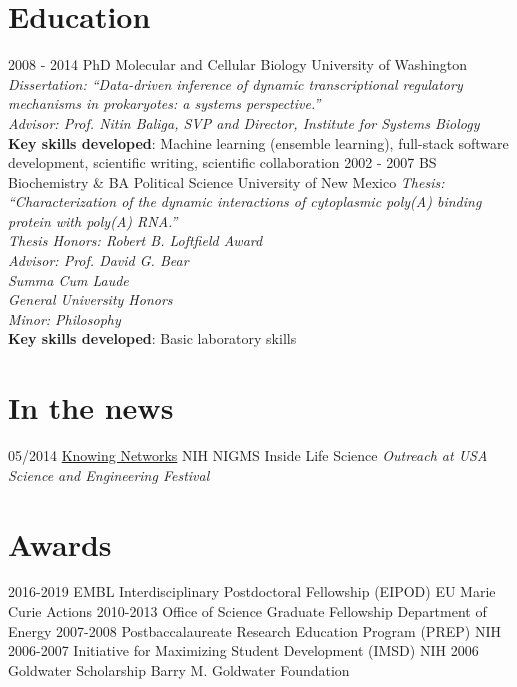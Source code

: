 \documentclass[usenames,dvipsnames]{friggeri-cv}
\begin{document}
\section{Education}
\begin{entrylist}
  \entry
    {2008 - 2014}
    {PhD Molecular and Cellular Biology}
    {University of Washington}
    {\emph{Dissertation: ``Data-driven inference of dynamic transcriptional regulatory mechanisms in prokaryotes: a systems perspective.''}\\
    \emph{Advisor: Prof. Nitin Baliga, SVP and Director, Institute for Systems Biology}\\
    \textbf{Key skills developed}: Machine learning (ensemble learning), full-stack software development, scientific writing, scientific collaboration}
  \entry
    {2002 - 2007}
    {BS Biochemistry \& BA Political Science}
    {University of New Mexico}
    {\emph{Thesis: ``Characterization of the dynamic interactions of cytoplasmic poly(A) binding protein with poly(A) RNA.''}\\
    \textit{Thesis Honors: Robert B. Loftfield Award}\\
    \emph{Advisor: Prof. David G. Bear}\\
    \textit{Summa Cum Laude}\\
    \textit{General University Honors}\\
    \textit{Minor: Philosophy}\\
    \textbf{Key skills developed}: Basic laboratory skills}
\end{entrylist}

\section{In the news}
\begin{entrylist}
  \entry
    {05/2014}
    {\href{http://publications.nigms.nih.gov/insidelifescience/knowing-networks.html}{Knowing Networks}}
    {NIH NIGMS Inside Life Science}
    {\emph{Outreach at USA Science and Engineering Festival}}
\end{entrylist}

\section{Awards}
\begin{entrylist}
   \entry
    {2016-2019}
    {EMBL Interdisciplinary Postdoctoral Fellowship (EIPOD)}
    {EU Marie Curie Actions}
    {}
  \entry
    {2010-2013}
    {Office of Science Graduate Fellowship}
    {Department of Energy}
    {}
     \entry
    {2007-2008}
    {Postbaccalaureate Research Education Program (PREP)}
    {NIH}
    {}
     \entry
    {2006-2007}
    {Initiative for Maximizing Student Development (IMSD)}
    {NIH}
    {}
   \entry
    {2006}
    {Goldwater Scholarship}
    {Barry M. Goldwater Foundation}
    {}
\end{entrylist}
\end{document}
